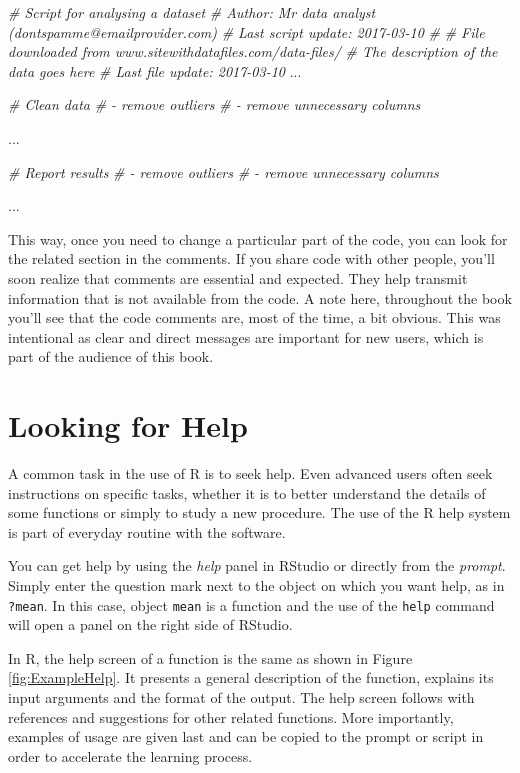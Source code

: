 \documentclass[11pt,]{book}
\newenvironment{Shaded}{\begin{snugshade}}{\end{snugshade}}
\newcommand{\CommentTok}[1]{\textcolor[rgb]{0.56,0.35,0.01}{\textit{#1}}}
\newcommand{\NormalTok}[1]{#1}
\begin{document}
\begin{Shaded}
\begin{Highlighting}[]
\CommentTok{# Script for analysing a dataset}
\CommentTok{# Author: Mr data analyst (dontspamme@emailprovider.com)}
\CommentTok{# Last script update: 2017-03-10}
\CommentTok{#}
\CommentTok{# File downloaded from www.sitewithdatafiles.com/data-files/}
\CommentTok{# The description of the data goes here}
\CommentTok{# Last file update: 2017-03-10}
\NormalTok{...}

\CommentTok{# Clean data}
\CommentTok{# - remove outliers}
\CommentTok{# - remove unnecessary columns}

\NormalTok{...}

\CommentTok{# Report results}
\CommentTok{# - remove outliers}
\CommentTok{# - remove unnecessary columns}

\NormalTok{...}
\end{Highlighting}
\end{Shaded}

This way, once you need to change a particular part of the code, you can
look for the related section in the comments. If you share code with
other people, you'll soon realize that comments are essential and
expected. They help transmit information that is not available from the
code. A note here, throughout the book you'll see that the code comments
are, most of the time, a bit obvious. This was intentional as clear and
direct messages are important for new users, which is part of the
audience of this book.

\section{Looking for Help}\label{looking-for-help}

A common task in the use of R is to seek help. Even advanced users often
seek instructions on specific tasks, whether it is to better understand
the details of some functions or simply to study a new procedure. The
use of the R help system is part of everyday routine with the software.

You can get help by using the \emph{help} panel in RStudio or directly
from the \emph{prompt}. Simply enter the question mark next to the
object on which you want help, as in \texttt{?mean}. In this case,
object \texttt{mean} is a function and the use of the \texttt{help}
command will open a panel on the right side of RStudio.

In R, the help screen of a function is the same as shown in Figure
\ref{fig:ExampleHelp}. It presents a general description of the
function, explains its input arguments and the format of the output. The
help screen follows with references and suggestions for other related
functions. More importantly, examples of usage are given last and can be
copied to the prompt or script in order to accelerate the learning
process.
\end{document}
